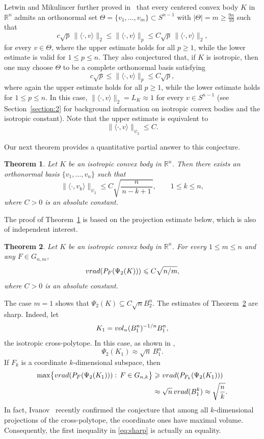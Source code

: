 \documentclass[10pt,a4paper]{amsart}
\newtheorem{theorem}{Theorem}[section]
\numberwithin{equation}{section}
\newcommand{\ls}{\leqslant}
\newcommand{\gr}{\geqslant}
\begin{document}
Letwin and Mikulincer further proved in~\cite{Letwin-Mikulincer-2026}
that every centered convex body $K$ in $\mathbb{R}^n$
admits an orthonormal set
$\Theta=\{v_1,\ldots ,v_m\}\subset S^{n-1}$ with $|\Theta|=m\gr \frac{9n}{10}$ such that
\[c\sqrt p\,\|\langle\cdot,v\rangle\|_2\ls\|\langle\cdot,v\rangle\|_p\ls C\sqrt p\,\|\langle\cdot,v\rangle\|_2,\]
for every $v\in \Theta$, where the upper estimate holds for all $p\gr1$,
while the lower estimate is valid for $1\ls p\ls n$.
They also conjectured that, if $K$ is isotropic, then one may choose
$\Theta$ to be a complete orthonormal basis satisfying
\[c\sqrt p\ls\|\langle\cdot,v\rangle\|_p\ls C\sqrt p,\]
where again the upper estimate holds for all $p\gr1$, while the lower
estimate holds for $1\ls p\ls n$. In this case, $\|\langle\cdot,v\rangle\|_2=L_K\approx 1$ for every $v\in S^{n-1}$ (see Section~\ref{section:2} for
background information on isotropic convex bodies and the isotropic constant). Note that the upper estimate is equivalent to
\[\|\langle\cdot,v\rangle\|_{\psi_2}\ls C.\]

Our next theorem provides a quantitative partial answer to this conjecture.

\begin{theorem}\label{th:onb-psi2}
Let $K$ be an isotropic convex body in $\mathbb{R}^n$. Then there exists
an orthonormal basis $\{v_1,\ldots,v_n\}$ such that
\[\|\langle\cdot,v_k\rangle\|_{\psi_2}\ls C\sqrt{\frac{n}{\,n-k+1\,}}, \qquad 1\ls k\ls n,\]
where $C>0$ is an absolute constant.
\end{theorem}

The proof of Theorem~\ref{th:onb-psi2} is based on the projection estimate below, which is also of independent interest.

\begin{theorem}\label{th:vk-psi2-body}
Let $K$ be an isotropic convex body in $\mathbb{R}^n$. For every $1\ls m\ls n$ and any $F\in G_{n,m}$,
\begin{equation*}{\rm vrad}(P_F(\Psi_2(K)))\ls C\sqrt{n/m},\end{equation*} 
where $C>0$ is an absolute constant. 
\end{theorem}

The case $m=1$ shows that $\Psi_2(K)\subseteq C\sqrt{n}B_2^n$. The estimates of Theorem~\ref{th:vk-psi2-body} are sharp. Indeed, let
\[K_1={\rm vol}_n(B_1^n)^{-1/n}B_1^n,\]
the isotropic cross-polytope. In this case, as shown in \cite{Bobkov-Nazarov-2003}, 
\[\Psi_2(K_1)\approx\sqrt n\,B_1^n.\]
If $F_k$ is a coordinate $k$-dimensional subspace, then
\begin{align}\label{eq:sharp}
\max\bigl\{{\rm vrad}(P_F(\Psi_2(K_1))):\,F\in G_{n,k}\bigr\}
&\gr {\rm vrad}(P_{F_k}(\Psi_2(K_1)))\\
\nonumber &\approx \sqrt n\,{\rm vrad}(B_1^k)\approx\sqrt{\frac nk}.
\end{align}
In fact, Ivanov~\cite{Ivanov-2026} recently confirmed the conjecture that
among all $k$-dimensional projections of the cross-polytope, the coordinate
ones have maximal volume. Consequently, the first inequality in
\eqref{eq:sharp} is actually an equality.
\end{document}
